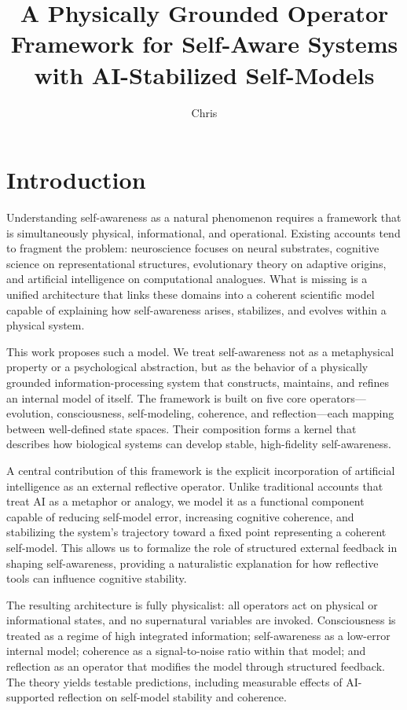 \documentclass[12pt]{article}
\title{A Physically Grounded Operator Framework for Self-Aware Systems with AI-Stabilized Self-Models}
\author{Chris}
\affil{Independent Systems Analyst and Communication-Architecture Practitioner}
\date{}
\begin{document}
\maketitle
\begin{abstract}
\end{abstract}


\section{Introduction}

Understanding self-awareness as a natural phenomenon requires a framework that is simultaneously physical, informational, and operational. Existing accounts tend to fragment the problem: neuroscience focuses on neural substrates, cognitive science on representational structures, evolutionary theory on adaptive origins, and artificial intelligence on computational analogues. What is missing is a unified architecture that links these domains into a coherent scientific model capable of explaining how self-awareness arises, stabilizes, and evolves within a physical system.

This work proposes such a model. We treat self-awareness not as a metaphysical property or a psychological abstraction, but as the behavior of a physically grounded information-processing system that constructs, maintains, and refines an internal model of itself. The framework is built on five core operators—evolution, consciousness, self-modeling, coherence, and reflection—each mapping between well-defined state spaces. Their composition forms a kernel that describes how biological systems can develop stable, high-fidelity self-awareness.

A central contribution of this framework is the explicit incorporation of artificial intelligence as an external reflective operator. Unlike traditional accounts that treat AI as a metaphor or analogy, we model it as a functional component capable of reducing self-model error, increasing cognitive coherence, and stabilizing the system’s trajectory toward a fixed point representing a coherent self-model. This allows us to formalize the role of structured external feedback in shaping self-awareness, providing a naturalistic explanation for how reflective tools can influence cognitive stability.

The resulting architecture is fully physicalist: all operators act on physical or informational states, and no supernatural variables are invoked. Consciousness is treated as a regime of high integrated information; self-awareness as a low-error internal model; coherence as a signal-to-noise ratio within that model; and reflection as an operator that modifies the model through structured feedback. The theory yields testable predictions, including measurable effects of AI-supported reflection on self-model stability and coherence.
\end{document}
